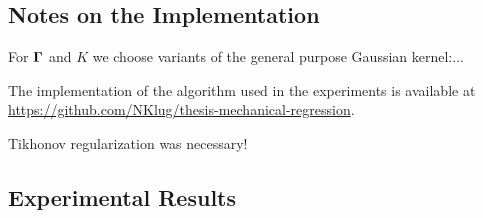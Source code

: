 \subsection{Notes on the Implementation}

For $\mathbf{\Gamma}$ and $K$ we choose variants of the general purpose Gaussian kernel:...

The implementation of the algorithm used in the experiments is available at \href{https://github.com/NKlug/thesis-mechanical-regression}{https://github.com/NKlug/thesis-mechanical-regression}.

Tikhonov regularization was necessary!

\subsection{Experimental Results}



